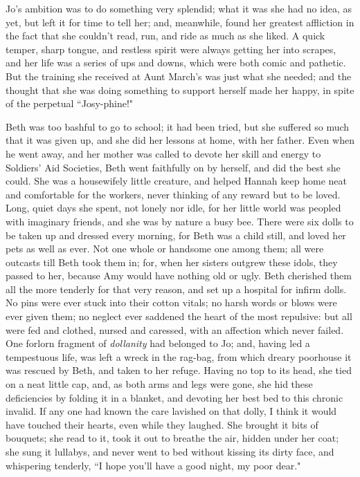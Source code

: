 Jo's ambition was to do something very splendid; what it
was she had no idea, as yet, but left it for time to tell her; and,
meanwhile, found her greatest affliction in the fact that she
couldn't read, run, and ride as much as she liked. A
quick temper, sharp tongue, and restless spirit were always getting her
into scrapes, and her life was a series of ups and downs, which were
both comic and pathetic. But the training she received at Aunt
March's was just what she needed; and the thought that
she was doing something to support herself made her happy, in spite of
the perpetual ``Josy-phine!"

Beth was too bashful to go to school; it had been tried, but she
suffered so much that it was given up, and she did her lessons at home,
with her father. Even when he went away, and her mother was called to
devote her skill and energy to Soldiers' Aid Societies,
Beth went faithfully on by herself, and did the best she could. She was
a housewifely little creature, and helped Hannah keep home neat and
comfortable for the workers, never thinking of any reward but to be
loved. Long, quiet days she spent, not lonely nor idle, for her little
world was peopled with imaginary friends, and she was by nature a busy
bee. There were six dolls to be taken up and dressed every morning, for
Beth was a child still, and loved her pets as well as ever. Not one
whole or handsome one among them; all were outcasts till Beth took them
in; for, when her sisters outgrew these idols, they passed to her,
because Amy would have nothing old or ugly. Beth cherished them all the
more tenderly for that very reason, and set up a hospital for infirm
dolls. No pins were ever stuck into their cotton vitals; no harsh words
or blows were ever given them; no neglect ever saddened the heart of the
most repulsive: but all were fed and clothed, nursed and caressed, with
an affection which never failed. One forlorn fragment of
\emph{dollanity} had belonged to Jo; and, having led a tempestuous life,
was left a wreck in the rag-bag, from which dreary poorhouse it was
rescued by Beth, and taken to her refuge. Having no top to its head, she
tied on a neat little cap, and, as both arms and legs were gone, she hid
these deficiencies by folding it in a blanket, and devoting her best bed
to this chronic invalid. If any one had known the care lavished on that
dolly, I think it would have touched their hearts, even while they
laughed. She brought it bits of bouquets; she read to it, took it out to
breathe the air, hidden under her coat; she sung it lullabys, and never
went to bed without kissing its dirty face, and whispering tenderly, ``I
hope you'll have a good night, my poor dear."

